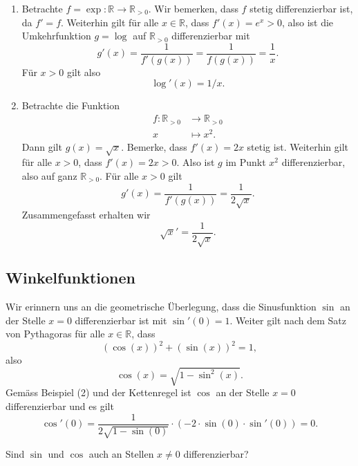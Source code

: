 \documentclass[../main.tex]{subfiles}
\begin{document}
\begin{examples}
  \leavevmode
  \begin{enumerate}[(1)]
    \item Betrachte $f = \exp \colon \mathbb{R} \to \mathbb{R}_{>0}$.
      Wir bemerken, dass $f$ stetig differenzierbar ist, da $f' = f$.
      Weiterhin gilt für alle $x \in \mathbb{R}$, dass
      $f'(x) = e^x > 0$, also ist die Umkehrfunktion $g = \log$ 
      auf $\mathbb{R}_{>0}$ differenzierbar mit
      \[
        g'(x) = \frac{1}{f'(g(x))} = \frac{1}{f(g(x))} = \frac{1}{x}.
      \]
      Für $x > 0$ gilt also
       \[
         \log'(x) = 1 / x.
      \]
    \item Betrachte die Funktion
      \begin{align*}
        f \colon \mathbb{R}_{> 0} & \to \mathbb{R}_{> 0} \\
        x & \mapsto x^2.
      \end{align*}
      Dann gilt $g(x) = \sqrt x$. Bemerke, dass
      $f'(x) = 2x$ stetig ist.
      Weiterhin gilt für alle $x > 0$, dass $f'(x) = 2 x > 0$.
      Also ist $g$ im Punkt $x^2$ differenzierbar,
      also auf ganz $\mathbb{R}_{>0}$. Für alle
      $x > 0$ gilt
      \[
        g'(x) = \frac{1}{f'(g(x))} = \frac{1}{2 \sqrt x}.
      \]
      Zusammengefasst erhalten wir
      \[
        \sqrt x ' = \frac{1}{2\sqrt x}.
      \]      
  \end{enumerate}
\end{examples}

\subsection*{Winkelfunktionen}
Wir erinnern uns an die geometrische Überlegung, dass
die Sinusfunktion
$\sin$ 
an der Stelle $x = 0$ differenzierbar ist mit
$\sin'(0) = 1$. Weiter gilt nach dem Satz
von Pythagoras für alle $x \in \mathbb{R}$,
dass
\[
  {(\cos(x))}^2 + {(\sin(x))}^2 = 1,
\]
also 
\[
  \cos(x) = \sqrt{1 - \sin^2(x)}.
\]
Gemäss Beispiel (2) und der
Kettenregel ist $\cos$ an der
Stelle $x = 0$ differenzierbar
und es gilt
\[
  \cos ' ( 0 ) = 
  \frac{1}{2 \sqrt{1 - \sin(0)}} \cdot (-2 \cdot \sin(0) \cdot \sin'(0)) = 0.
\]

\begin{question}
  Sind $\sin$ und $\cos$ auch an Stellen $x \neq 0$
  differenzierbar?
\end{question}
\end{document}
